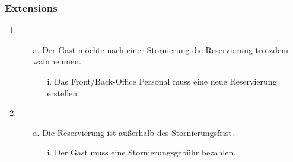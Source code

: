 \documentclass[./detailed_overview_usecases.tex]{subfiles}
\begin{document}
    \subsubsection*{Extensions}
    \begin{enumerate}
        \item
            \begin{itemize}
                \item[a.] Der Gast möchte nach einer Stornierung die Reservierung trotzdem wahrnehmen.
                    \begin{itemize}
                        \item[i.] Das Front/Back-Office Personal muss eine neue Reservierung erstellen.
                    \end{itemize}
            \end{itemize}
        \item
            \begin{itemize}
                \item[a.] Die Reservierung ist außerhalb des Stornierungsfrist.
                    \begin{itemize}
                        \item[i.] Der Gast muss eine Stornierungsgebühr bezahlen.
                    \end{itemize}
            \end{itemize}
    \end{enumerate}
\end{document}
